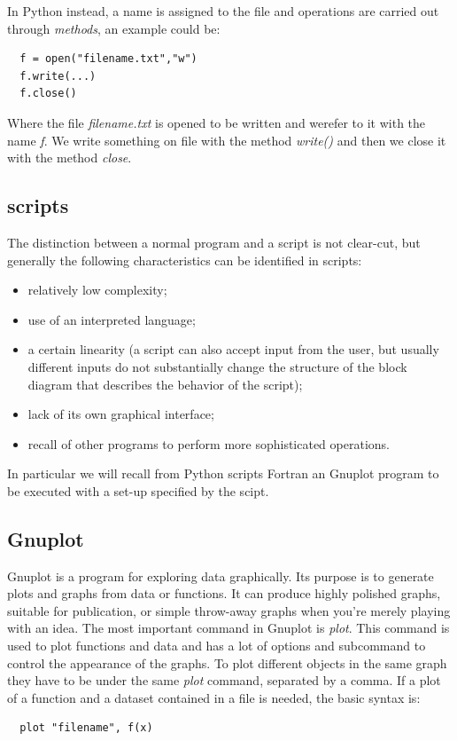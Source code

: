 \documentclass[prb,9pt,notitlepage]{revtex4-1}
\begin{document}
In Python instead, a name is assigned to the file and operations are carried out through \textit{methods}, an example could be:

\begin{lstlisting}
  f = open("filename.txt","w")
  f.write(...)
  f.close()
\end{lstlisting}
Where the file \textit{filename.txt} is opened to be written and werefer to it with the name \textit{f}. We write something on file with the method \textit{write()} and then we close it with the method \textit{close}.

\subsection{scripts}
The distinction between a normal program and a script is not clear-cut, but generally the following characteristics can be identified in scripts:
\begin{itemize}
  \item relatively low complexity;
  \item use of an interpreted language;
  \item a certain linearity (a script can also accept input from the user, but usually different inputs do not substantially change the structure of the block diagram that describes the behavior of the script);
  \item lack of its own graphical interface;
  \item recall of other programs to perform more sophisticated operations.
\end{itemize}
In particular we will recall from Python scripts Fortran an Gnuplot program to be executed with a set-up specified by the scipt.

\subsection{Gnuplot}
Gnuplot is a program for exploring data graphically. Its purpose is to generate plots and graphs from data or functions. It can produce highly polished graphs, suitable for publication, or simple throw-away graphs when you’re merely playing with an idea.
The most important command in Gnuplot is \textit{plot}. This command is used to plot functions and data and has a lot of options and subcommand to control the appearance of the graphs. To plot different objects in the same graph they have to be under the same \textit{plot} command, separated by a comma. If a plot of a function and a dataset contained in a file is needed, the basic syntax is:
\begin{lstlisting}
  plot "filename", f(x)
\end{lstlisting}
\end{document}
